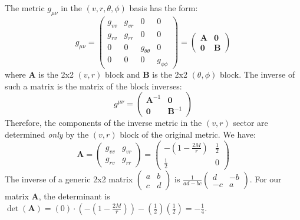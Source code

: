\begin{solution}
The metric $g_{\mu\nu}$ in the $(v, r, \theta, \phi)$ basis has the form:
\[
g_{\mu\nu} = 
\begin{pmatrix}
g_{vv} & g_{vr} & 0 & 0 \\
g_{rv} & g_{rr} & 0 & 0 \\
0 & 0 & g_{\theta\theta} & 0 \\
0 & 0 & 0 & g_{\phi\phi}
\end{pmatrix}
=
\begin{pmatrix}
\mathbf{A} & \mathbf{0} \\
\mathbf{0} & \mathbf{B}
\end{pmatrix}
\]
where $\mathbf{A}$ is the 2x2 $(v, r)$ block and $\mathbf{B}$ is the 2x2 $(\theta, \phi)$ block. The inverse of such a matrix is the matrix of the block inverses:
\[
g^{\mu\nu} = 
\begin{pmatrix}
\mathbf{A}^{-1} & \mathbf{0} \\
\mathbf{0} & \mathbf{B}^{-1}
\end{pmatrix}
\]
Therefore, the components of the inverse metric in the $(v, r)$ sector are determined \textit{only} by the $(v, r)$ block of the original metric. We have:
\[
\mathbf{A} = 
\begin{pmatrix}
g_{vv} & g_{vr} \\
g_{rv} & g_{rr}
\end{pmatrix}
=
\begin{pmatrix}
-(1 - \frac{2M}{r}) & \frac{1}{2} \\
\frac{1}{2} & 0
\end{pmatrix}
\]
The inverse of a generic 2x2 matrix $\begin{pmatrix} a & b \\ c & d \end{pmatrix}$ is $\frac{1}{ad-bc} \begin{pmatrix} d & -b \\ -c & a \end{pmatrix}$. For our matrix $\mathbf{A}$, the determinant is $\det(\mathbf{A}) = (0) \cdot (-(1-\frac{2M}{r})) - (\frac{1}{2})(\frac{1}{2}) = -\frac{1}{4}$.

\end{solution}

